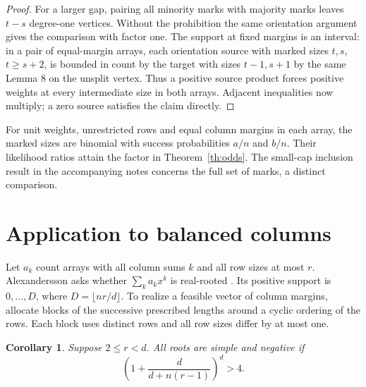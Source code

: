 \documentclass[11pt]{article}
\newtheorem{corollary}[theorem]{Corollary}
\begin{document}
\begin{proof}
For a larger gap, pairing all minority marks with majority marks leaves $t-s$ degree-one vertices. Without the prohibition the same orientation argument gives the comparison with factor one. The support at fixed margins is an interval: in a pair of equal-margin arrays, each orientation source with marked sizes $t,s$, $t\ge s+2$, is bounded in count by the target with sizes $t-1,s+1$ by the same Lemma 8 on the unsplit vertex. Thus a positive source product forces positive weights at every intermediate size in both arrays. Adjacent inequalities now multiply; a zero source satisfies the claim directly.
\end{proof}

For unit weights, unrestricted rows and equal column margins in each array, the marked sizes are binomial with success probabilities $a/n$ and $b/n$. Their likelihood ratios attain the factor in Theorem~\ref{th:odds}. The small-cap inclusion result in the accompanying notes concerns the full set of marks, a distinct comparison.

\section{Application to balanced columns}
Let $a_k$ count arrays with all column sums $k$ and all row sizes at most $r$. Alexandersson asks whether $\sum_k a_k x^k$ is real-rooted \cite{alex}. Its positive support is $0,\ldots,D$, where $D=\lfloor nr/d\rfloor$. To realize a feasible vector of column margins, allocate blocks of the successive prescribed lengths around a cyclic ordering of the rows. Each block uses distinct rows and all row sizes differ by at most one.

\begin{corollary}\label{cor:roots}
Suppose $2\le r<d$. All roots are simple and negative if
\[
 \left(1+\frac{d}{d+n(r-1)}\right)^d>4.
\]
\end{corollary}
\end{document}
